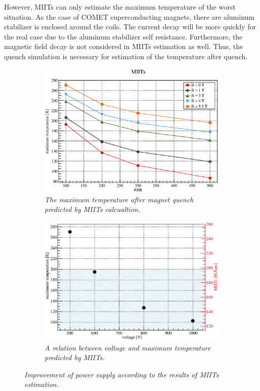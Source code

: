 However, MIITs can only estimate the maximum temperature of the worst situation.
As the case of COMET superconducting magnets, there are aluminum stabilizer is enclosed around the coils.
The current decay will be more quickly for the real case due to the aluminum stabilizer self resistance.
Furthermore, the magnetic field decay is not considered in MIITs estimation as well.
Thus, the quench simulation is necessary for estimation of the temperature after quench.
  \begin{figure}[H]
   \begin{subfigure}{3.1in}
    \centering
    \includegraphics[scale=0.43]{chapter5/fig/RRRvsMIITs.eps}
    \caption{\it The maximum temperature after magnet quench predicted by MIITs calcualtion.}
    \label{4rrrmiits}
   \end{subfigure}
   \quad
   \begin{subfigure}{3.1in}
    \centering
    \includegraphics[scale=0.43]{chapter5/fig/miitsvoltage.eps}
    \caption{\it A relation between voltage and maximum temperature predicted by MIITs.}
    \label{4miitsv}
   \end{subfigure}
   \caption{\it Improvement of power supply according to the results of MIITs estimation.}
  \end{figure}


